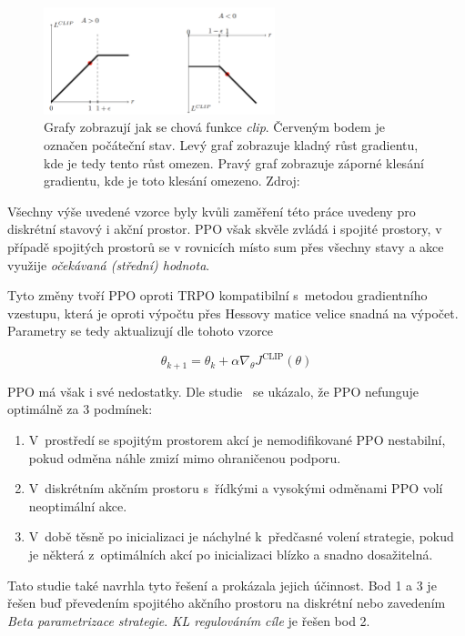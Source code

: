 \begin{figure}[H]
	\centering
	\includegraphics[width=0.6\textwidth]{obrazky-figures/clip}
	\caption{Grafy zobrazují jak se chová funkce \emph{clip}.
  Červeným bodem je označen počáteční stav.
  Levý graf zobrazuje kladný růst gradientu, kde je tedy tento růst omezen.
  Pravý graf zobrazuje záporné klesání gradientu, kde je toto klesání omezeno.
  Zdroj:~\cite{RL_basics}}\label{fig:clip}
\end{figure}

Všechny výše uvedené vzorce byly kvůli zaměření této práce uvedeny pro diskrétní stavový i akční prostor.
PPO však skvěle zvládá i spojité prostory, v případě spojitých prostorů se v rovnicích místo sum přes všechny stavy a akce využije \emph{očekávaná (střední) hodnota}.


Tyto změny tvoří PPO oproti TRPO kompatibilní s~metodou gradientního vzestupu, která je oproti výpočtu přes Hessovy matice velice snadná na výpočet.
Parametry se tedy aktualizují dle tohoto vzorce

\begin{equation}
  \theta_{k+1} = \theta_k + \alpha \nabla_\theta J^{\text{CLIP}}(\theta)
\end{equation}

PPO má však i své nedostatky.
\label{PPO_weakness}
Dle studie~\cite{PPO_weakness} se ukázalo, že PPO nefunguje optimálně za 3 podmínek:
\begin{enumerate}
  \item V~prostředí se spojitým prostorem akcí je nemodifikované PPO nestabilní, pokud odměna náhle zmizí mimo ohraničenou podporu.
  \item V~diskrétním akčním prostoru s~řídkými a vysokými odměnami PPO volí neoptimální akce.
  \item V~době těsně po inicializaci je náchylné k~předčasné volení strategie, pokud je některá z~optimálních akcí po inicializaci blízko a snadno dosažitelná.
\end{enumerate}

Tato studie také navrhla tyto řešení a prokázala jejich účinnost.
Bod 1 a 3 je řešen buď převedením spojitého akčního prostoru na diskrétní nebo zavedením \emph{Beta parametrizace strategie}.
\emph{KL regulováním cíle} je řešen bod 2.

